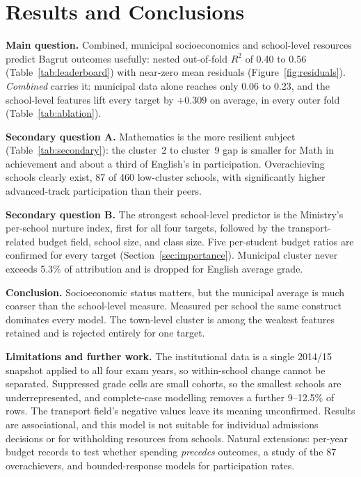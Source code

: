 \section{Results and Conclusions}
\label{sec:conclusions}

\textbf{Main question.} Combined, municipal socioeconomics and school-level
resources predict Bagrut outcomes usefully: nested out-of-fold $R^2$ of 0.40 to
0.56 (Table~\ref{tab:leaderboard}) with near-zero mean residuals
(Figure~\ref{fig:residuals}). \emph{Combined} carries it: municipal data alone
reaches only 0.06 to 0.23, and the school-level features lift every target by
$+0.309$ on average, in every outer fold (Table~\ref{tab:ablation}).

\textbf{Secondary question A.} Mathematics is the more resilient subject
(Table~\ref{tab:secondary}): the cluster~2 to cluster~9 gap is smaller for Math
in achievement and about a third of English's in participation. Overachieving
schools clearly exist, 87 of 460 low-cluster schools, with significantly higher
advanced-track participation than their peers.

\textbf{Secondary question B.} The strongest school-level predictor is the
Ministry's per-school nurture index, first for all four targets, followed by the
transport-related budget field, school size, and class size. Five per-student
budget ratios are confirmed for every target (Section~\ref{sec:importance}).
Municipal cluster never exceeds 5.3\% of attribution and is dropped for English
average grade.

\textbf{Conclusion.} Socioeconomic status matters, but the municipal average is
much coarser than the school-level measure. Measured per school the same
construct dominates every model. The town-level cluster is among the weakest
features retained and is rejected entirely for one target.

\textbf{Limitations and further work.} The institutional data is a single 2014/15
snapshot applied to all four exam years, so within-school change cannot be
separated. Suppressed grade cells are small cohorts, so the smallest schools are
underrepresented, and complete-case modelling removes a further 9--12.5\% of
rows. The transport field's negative values leave its meaning unconfirmed.
Results are associational, and this model is not suitable for individual
admissions decisions or for withholding resources from schools. Natural
extensions: per-year budget records to test whether spending \emph{precedes}
outcomes, a study of the 87 overachievers, and bounded-response models for
participation rates.
